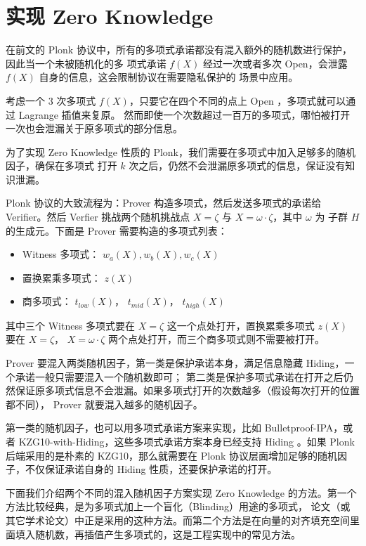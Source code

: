 \hypertarget{ux7406ux89e3-plonkux516dux5b9eux73b0-zero-knowledge}{%
\chapter{实现 Zero Knowledge}\label{ux7406ux89e3-plonkux516dux5b9eux73b0-zero-knowledge}}

在前文的 Plonk
协议中，所有的多项式承诺都没有混入额外的随机数进行保护，因此当一个未被随机化的多
项式承诺 \(f(X)\) 经过一次或者多次 Open，会泄露 \(f(X)\)
自身的信息，这会限制协议在需要隐私保护的 场景中应用。

考虑一个 \(3\) 次多项式 \(f(X)\)，只要它在四个不同的点上 Open
，多项式就可以通过 Lagrange 插值来复原。
然而即使一个次数超过一百万的多项式，哪怕被打开一次也会泄漏关于原多项式的部分信息。

为了实现 Zero Knowledge 性质的
Plonk，我们需要在多项式中加入足够多的随机因子，确保在多项式 打开 \(k\)
次之后，仍然不会泄漏原多项式的信息，保证没有知识泄漏。

Plonk 协议的大致流程为：Prover 构造多项式，然后发送多项式的承诺给
Verifier。然后 Verfier 挑战两个随机挑战点 \(X=\zeta\) 与
\(X=\omega\cdot \zeta\)，其中 \(\omega\) 为 子群 \(H\) 的生成元。下面是
Prover 需要构造的多项式列表：

\begin{itemize}
\item
  Witness 多项式： \(w_a(X), w_b(X), w_c(X)\)
\item
  置换累乘多项式： \(z(X)\)
\item
  商多项式： \(t_{low}(X)\)， \(t_{mid}(X)\)， \(t_{high}(X)\)
\end{itemize}

其中三个 Witness 多项式要在 \(X=\zeta\) 这一个点处打开，置换累乘多项式
\(z(X)\) 要在 \(X=\zeta\)， \(X=\omega\cdot\zeta\)
两个点处打开，而三个商多项式则不需要被打开。

Prover 要混入两类随机因子，第一类是保护承诺本身，满足信息隐藏
Hiding，一个承诺一般只需要混入一个随机数即可；
第二类是保护多项式承诺在打开之后仍然保证原多项式信息不会泄漏。如果多项式打开的次数越多（假设每次打开的位置都不同），
Prover 就要混入越多的随机因子。

第一类的随机因子，也可以用多项式承诺方案来实现，比如
Bulletproof-IPA，或者 KZG10-with-Hiding，这些多项式承诺方案本身已经支持
Hiding 。如果 Plonk 后端采用的是朴素的 KZG10，那么就需要在 Plonk
协议层面增加足够的随机因子，不仅保证承诺自身的 Hiding
性质，还要保护承诺的打开。

下面我们介绍两个不同的混入随机因子方案实现 Zero Knowledge
的方法。第一个方法比较经典，是为多项式加上一个盲化（Blinding）用途的多项式，\cite{Plonk}
论文（或其它学术论文）中正是采用的这种方法。而第二个方法是在向量的对齐填充空间里面填入随机数，再插值产生多项式的，这是工程实现中的常见方法。

